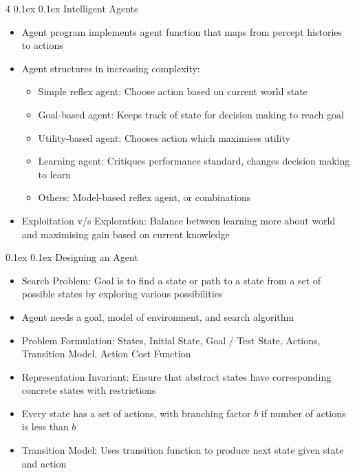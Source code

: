 \documentclass[10pt, landscape]{article}
\makeatletter
\renewcommand{\subsection}{\@startsection{subsection}{2}{0mm}%
  {0.1ex} %
  {0.1ex} %
  {\normalfont\normalsize\bfseries}}
\makeatother
\begin{document}
\begin{multicols*}{4}
\subsection{Intelligent Agents}
\begin{itemize}
    \item Agent program implements agent function that maps from percept histories to actions
    \item Agent structures in increasing complexity:
    \begin{itemize}
        \item Simple reflex agent: Choose action based on current world state
        \item Goal-based agent: Keeps track of state for decision making to reach goal
        \item Utility-based agent: Chooses action which maximises utility
        \item Learning agent: Critiques performance standard, changes decision making to learn
        \item Others: Model-based reflex agent, or combinations
    \end{itemize}
    \item Exploitation v/s Exploration: Balance between learning more about world and maximising gain based on current knowledge
\end{itemize}

\subsection{Designing an Agent}
\begin{itemize}
    \item Search Problem: Goal is to find a state or path to a state from a set of possible states by exploring various possibilities
    \item Agent needs a goal, model of environment, and search algorithm
    \item Problem Formulation: States, Initial State, Goal / Test State, Actions, Transition Model, Action Cost Function
    \item Representation Invariant: Ensure that abstract states have corresponding concrete states with restrictions
    \item Every state has a set of actions, with branching factor $b$ if number of actions is less than $b$
    \item Transition Model: Uses transition function to produce next state given state and action
\end{itemize}


\end{multicols*}
\end{document}
